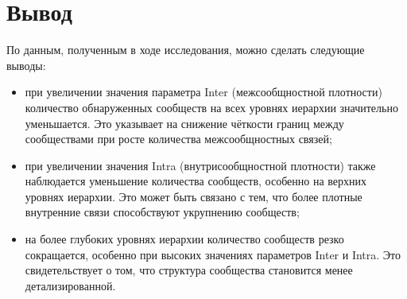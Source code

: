 \section*{Вывод}

По данным, полученным в ходе исследования, можно сделать следующие выводы:
\begin{itemize}
\item при увеличении значения параметра Inter (межсообщностной плотности) количество обнаруженных сообществ на всех уровнях иерархии значительно уменьшается. Это указывает на снижение чёткости границ между сообществами при росте количества межсообщностных связей;
\item при увеличении значения Intra (внутрисообщностной плотности) также наблюдается уменьшение количества сообществ, особенно на верхних уровнях иерархии. Это может быть связано с тем, что более плотные внутренние связи способствуют укрупнению сообществ;
\item на более глубоких уровнях иерархии количество сообществ резко сокращается, особенно при высоких значениях параметров Inter и Intra. Это свидетельствует о том, что структура сообщества становится менее детализированной.
\end{itemize}
